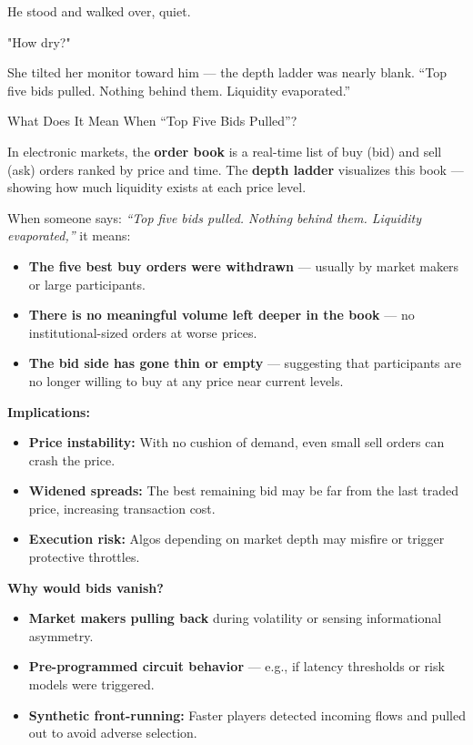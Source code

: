 \medskip

He stood and walked over, quiet.

"How dry?"

She tilted her monitor toward him — the depth ladder was nearly blank.
“Top five bids pulled. Nothing behind them. Liquidity evaporated.”

\medskip

\begin{TechnicalSidebar}{What Does It Mean When “Top Five Bids Pulled”?}

  In electronic markets, the \textbf{order book} is a real-time list of buy (bid) and sell (ask) orders ranked by price and time.  
  The \textbf{depth ladder} visualizes this book — showing how much liquidity exists at each price level.
  
  \medskip
  
  When someone says:  
  \textit{“Top five bids pulled. Nothing behind them. Liquidity evaporated,”}  
  it means:
  
  \begin{itemize}
    \item \textbf{The five best buy orders were withdrawn} — usually by market makers or large participants.
    \item \textbf{There is no meaningful volume left deeper in the book} — no institutional-sized orders at worse prices.
    \item \textbf{The bid side has gone thin or empty} — suggesting that participants are no longer willing to buy at any price near current levels.
  \end{itemize}
  
  \medskip
  
  \textbf{Implications:}
  \begin{itemize}
    \item \textbf{Price instability:} With no cushion of demand, even small sell orders can crash the price.
    \item \textbf{Widened spreads:} The best remaining bid may be far from the last traded price, increasing transaction cost.
    \item \textbf{Execution risk:} Algos depending on market depth may misfire or trigger protective throttles.
  \end{itemize}
  
  \medskip
  
  \textbf{Why would bids vanish?}
  \begin{itemize}
    \item \textbf{Market makers pulling back} during volatility or sensing informational asymmetry.
    \item \textbf{Pre-programmed circuit behavior} — e.g., if latency thresholds or risk models were triggered.
    \item \textbf{Synthetic front-running:} Faster players detected incoming flows and pulled out to avoid adverse selection.
  \end{itemize}
  

\end{TechnicalSidebar}
